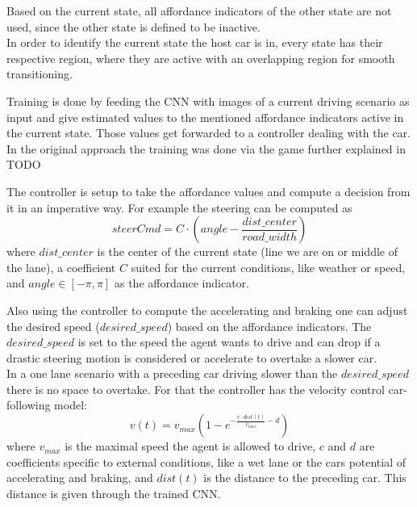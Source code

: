 Based on the current state, all affordance indicators of the other state are not used, since the other state is defined to be inactive.\\
In order to identify the current state the host car is in, every state has their respective region, where they are active with an overlapping region for smooth transitioning.

Training is done by feeding the CNN with images of a current driving scenario as input and give estimated values to the mentioned affordance indicators active in the current state. Those values get forwarded to a controller dealing with the car. In the original approach the training was done via the \torcs game further explained in TODO %

The controller is setup to take the affordance values and compute a decision from it in an imperative way. For example the steering can be computed as 
	$$ steerCmd = C \cdot (angle-\frac{dist\_center}{road\_width})$$
where $dist\_center$ is the center of the current state (line we are on or middle of the lane), a coefficient $C$ suited for the current conditions, like weather or speed, and $angle\in [-\pi, \pi]$ as the affordance indicator.

Also using the controller to compute the accelerating and braking one can adjust the desired speed ($desired\_speed$) based on the affordance indicators. The $desired\_speed$ is set to the speed the agent wants to drive and can drop if a drastic steering motion is considered or accelerate to overtake a slower car.\\
In a one lane scenario with a  preceding car driving slower than the $desired\_speed$ there is no space to overtake. For that the controller has the velocity control car-following model:
	$$ v(t) = v_{max}(1-e^{-\frac{c\cdot dist(t)}{v_{max}} -d})$$ 
where $v_{max}$ is the maximal speed the agent is allowed to drive, $c$ and $d$ are coefficients specific to external conditions, like a wet lane or the cars potential of accelerating and braking, and $dist(t)$ is the distance to the preceding car. This distance is given through the trained CNN.




